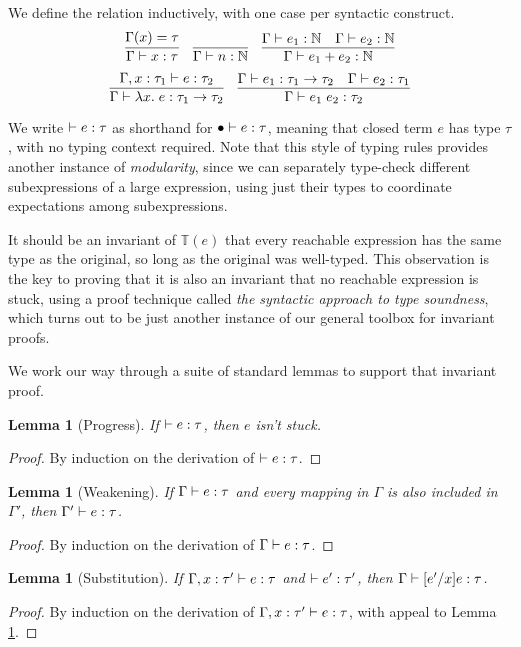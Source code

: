 \documentclass{amsbook}
\newtheorem{lemma}[theorem]{Lemma}
\theoremstyle{definition}
\theoremstyle{remark}
\numberwithin{section}{chapter}
\numberwithin{equation}{chapter}
\begin{document}
We define the relation inductively, with one case per syntactic construct.
\modularity
$$\infer{\hasty{\Gamma}{x}{\tau}}{
  \msel{\Gamma}{x} = \tau
}
\quad \infer{\hasty{\Gamma}{n}{\mathbb N}}{}
\quad \infer{\hasty{\Gamma}{e_1 + e_2}{\mathbb N}}{
    \hasty{\Gamma}{e_1}{\mathbb N}
    & \hasty{\Gamma}{e_2}{\mathbb N}
}$$
$$\infer{\hasty{\Gamma}{\lambda x. \; e}{\tau_1 \to \tau_2}}{
  \hasty{\Gamma, x : \tau_1}{e}{\tau_2}
}
\quad \infer{\hasty{\Gamma}{e_1 \; e_2}{\tau_2}}{
  \hasty{\Gamma}{e_1}{\tau_1 \to \tau_2}
  & \hasty{\Gamma}{e_2}{\tau_1}
}$$

We write $\hasty{}{e}{\tau}$ as shorthand for $\hasty{\mempty}{e}{\tau}$, meaning that closed term $e$ has type $\tau$, with no typing context required.
Note that this style of typing rules provides another instance of \emph{modularity}, since we can separately type-check different subexpressions of a large expression, using just their types to coordinate expectations among subexpressions.

It should be an invariant of $\mathbb T(e)$ that every reachable expression has the same type as the original, so long as the original was well-typed.
This observation is the key to proving that it is also an invariant that no reachable expression is stuck, using a proof technique called \emph{the syntactic approach to type soundness}, which turns out to be just another instance of our general toolbox for invariant proofs.

We work our way through a suite of standard lemmas to support that invariant proof.

\begin{lemma}[Progress]\label{progress}
  If $\hasty{}{e}{\tau}$, then $e$ isn't stuck.
\end{lemma}
\begin{proof}
  By induction on the derivation of $\hasty{}{e}{\tau}$.
\end{proof}

\begin{lemma}[Weakening]\label{weakening}
  If $\hasty{\Gamma}{e}{\tau}$ and every mapping in $\Gamma$ is also included in $\Gamma'$, then $\hasty{\Gamma'}{e}{\tau}$.
\end{lemma}
\begin{proof}
  By induction on the derivation of $\hasty{\Gamma}{e}{\tau}$.
\end{proof}

\begin{lemma}[Substitution]\label{substitution}
  If $\hasty{\Gamma, x : \tau'}{e}{\tau}$ and $\hasty{}{e'}{\tau'}$, then $\hasty{\Gamma}{\subst{e}{x}{e'}}{\tau}$.
\end{lemma}
\begin{proof}
  By induction on the derivation of $\hasty{\Gamma, x: \tau'}{e}{\tau}$, with appeal to Lemma \ref{weakening}.
\end{proof}
\end{document}
